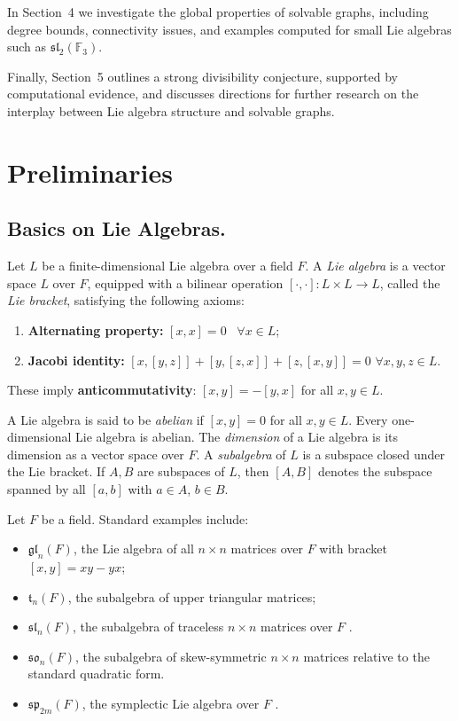 \documentclass[11pt]{amsart}
\theoremstyle{plain}
\def\F{\mathbb{F}}
\begin{document}
In Section~4 we investigate the global properties of solvable graphs, including degree bounds, connectivity issues, and examples computed for small Lie algebras such as $\mathfrak{sl}_2(\F_3)$. 

Finally, Section~5 outlines a strong divisibility conjecture, supported by computational evidence, and discusses directions for further research on the interplay between Lie algebra structure and solvable graphs.



\section{Preliminaries}

\subsection*{Basics on Lie Algebras.}
Let $L$ be a finite-dimensional Lie algebra over a field $F$. A \emph{Lie algebra} is a vector space $L$ over $F$, equipped with a bilinear operation $[\cdot,\cdot]: L \times L \to L$, called the \emph{Lie bracket}, satisfying the following axioms:
\begin{enumerate}
    \item \textbf{Alternating property:} $[x,x] = 0$ \ $\forall  x \in L$;
    \item \textbf{Jacobi identity:} $[x,[y,z]] + [y,[z,x]] + [z,[x,y]] = 0$ $\forall x, y, z \in L$.
\end{enumerate}
These imply \textbf{anticommutativity}: $[x,y] = -[y,x]$ for all $x,y \in L$.

A Lie algebra is said to be \emph{abelian} if $[x,y] = 0$ for all $x,y \in L$. Every one-dimensional Lie algebra is abelian. The \emph{dimension} of a Lie algebra is its dimension as a vector space over $F$. A \emph{subalgebra} of $L$ is a subspace closed under the Lie bracket. If $A, B$ are subspaces of $L$, then $[A,B]$ denotes the subspace spanned by all $[a,b]$ with $a \in A$, $b \in B$. 

 Let $F$ be a field. Standard examples include: 
\begin{itemize}
    \item $\mathfrak{gl}_n(F)$, the Lie algebra of all $n \times n$ matrices over $F$ with bracket $[x,y] = xy - yx$;
   \item $\mathfrak{t}_n(F)$, the subalgebra of upper triangular matrices;
    \item $\mathfrak{sl}_n(F)$, the subalgebra of traceless $n \times n$ matrices over $F$ .
   \item $\mathfrak{so}_n(F)$, the subalgebra of skew-symmetric $n \times n$  matrices relative to the standard quadratic form.
    \item $\mathfrak{sp}_{2m}(F)$, the symplectic Lie algebra over $F$ .
\end{itemize}
\end{document}
